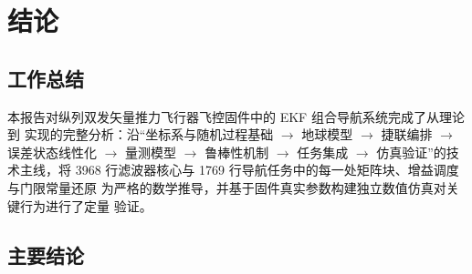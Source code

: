 \section{结论}

\subsection{工作总结}

本报告对纵列双发矢量推力飞行器飞控固件中的 EKF 组合导航系统完成了从理论到
实现的完整分析：沿``坐标系与随机过程基础 $\rightarrow$ 地球模型 $\rightarrow$
捷联编排 $\rightarrow$ 误差状态线性化 $\rightarrow$ 量测模型 $\rightarrow$
鲁棒性机制 $\rightarrow$ 任务集成 $\rightarrow$ 仿真验证''的技术主线，将
3968 行滤波器核心与 1769 行导航任务中的每一处矩阵块、增益调度与门限常量还原
为严格的数学推导，并基于固件真实参数构建独立数值仿真对关键行为进行了定量
验证。

\subsection{主要结论}

